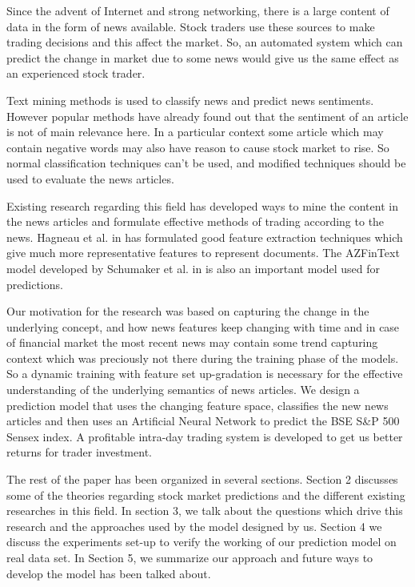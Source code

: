 \documentclass[review,twocolumn,5p]{elsarticle}
\begin{document}
Since the advent of Internet and strong networking, there is a large content of data in the form of news available. Stock traders use these sources to make trading decisions and this affect the market. So, an automated system which can predict the change in market due to some news would give us the same effect as an experienced stock trader.

Text mining methods is used to classify news and predict news sentiments. However popular methods have already found out that the sentiment of an article is not of main relevance here. In a particular context some article which may contain negative words may also have reason to cause stock market to rise. So normal classification techniques can't be used, and modified techniques should be used to evaluate the news articles.

Existing research regarding this field has developed ways to mine the content in the news articles and formulate effective methods of trading according to the news. Hagneau et al. in \cite{Hagenau:2013} has formulated good feature extraction techniques which give much more representative features to represent documents. The AZFinText model developed by Schumaker et al. in \cite{Schumaker:2009} is also an important model used for predictions.

Our motivation for the research was based on capturing the change in the underlying concept, and how news features keep changing with time and in case of financial market the most recent news may contain some trend capturing context which was preciously not there during the training phase of the models. So a dynamic training with feature set up-gradation is necessary for the effective understanding of the underlying semantics of news articles. We design a prediction model that uses the changing feature space, classifies the new news articles and then uses an Artificial Neural Network to predict the BSE S\&P 500 Sensex index. A profitable intra-day trading system is developed to get us better returns for trader investment. 

The rest of the paper has been organized in several sections. Section 2 discusses some of the theories regarding stock market predictions and the different existing researches in this field. In section 3, we talk about the questions which drive this research and the approaches used by the model designed by us. Section 4 we discuss the experiments set-up to verify the working of our prediction model on real data set. In Section 5, we summarize our approach and future ways to develop the model has been talked about. 
\end{document}

